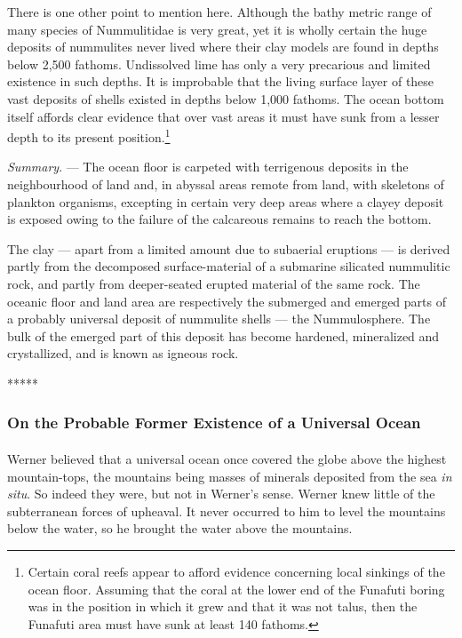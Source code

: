 \documentclass[a4paper, 12pt, oneside]{article}
\begin{document}
There is one other point to mention here. Although the bathy metric range of many species of Nummulitidae is very great, yet it is wholly certain the huge deposits of nummulites never lived where their clay models are found in depths below 2,500 fathoms. Undissolved lime has only a very precarious and limited existence in such depths. It is improbable that the living surface layer of these vast deposits of shells existed in depths below 1,000 fathoms. The ocean bottom itself affords clear evidence that over vast areas it must have sunk from a lesser depth to its present position.\footnote{Certain coral reefs appear to afford evidence concerning local sinkings of the ocean floor. Assuming that the coral at the lower end of the Funafuti boring was in the position in which it grew and that it was not talus, then the Funafuti area must have sunk at least 140 fathoms.} 

\emph{Summary}. --- The ocean floor is carpeted with terrigenous deposits in the neighbourhood of land and, in abyssal areas remote from land, with skeletons of plankton organisms, excepting in certain very deep areas where a clayey deposit is exposed owing to the failure of the calcareous remains to reach the bottom.

The clay --- apart from a limited amount due to subaerial eruptions --- is derived partly from the decomposed surface-material of a submarine silicated nummulitic rock, and partly from deeper-seated erupted material of the same rock. The oceanic floor and land area are respectively the submerged and emerged parts of a probably universal deposit of nummulite shells --- the Nummulosphere. The bulk of the emerged part of this deposit has become hardened, mineralized and crystallized, and is known as igneous rock.

\centerline{*\hspace{15mm}*\hspace{15mm}*\hspace{15mm}*\hspace{15mm}*}
\bigskip
\subsubsection{On the Probable Former Existence of a Universal Ocean}
\paragraph{}
Werner believed that a universal ocean once covered the globe above the highest mountain-tops, the mountains being masses of minerals deposited from the sea \emph{in situ}. So indeed they were, but not in Werner's sense. Werner knew little of the subterranean forces of upheaval. It never occurred to him to level the mountains below the water, so he brought the water above the mountains.
\end{document}
